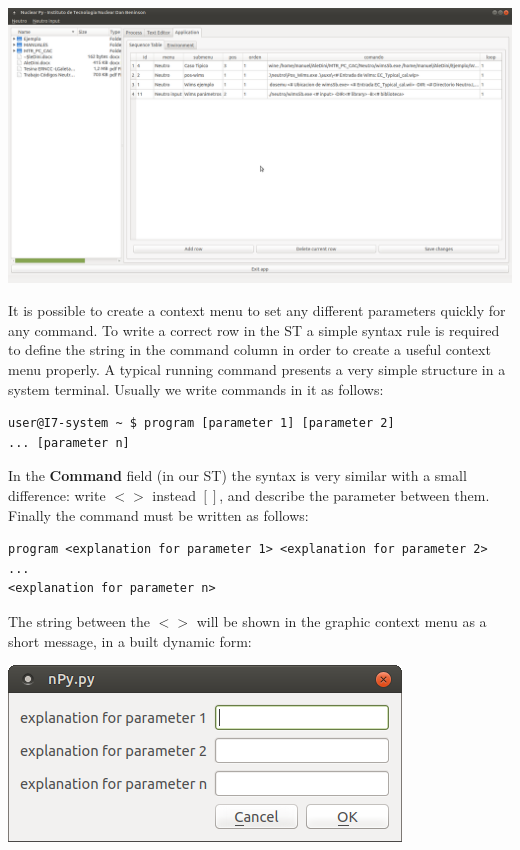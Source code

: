 \documentclass[a4paper,10pt]{article}
\begin{document}
\begin{center}
 \includegraphics[width=\textwidth]{img/sequenceTable.png}
\end{center}

It is possible to create a context menu to set any different parameters quickly for any command. To write a correct row in the ST a simple syntax rule is required to define the string in the command column in order to create a useful context menu properly. A typical running command presents a very simple structure in a system terminal. Usually we write commands in it as follows:

\begin{verbatim}
user@I7-system ~ $ program [parameter 1] [parameter 2] 
... [parameter n]
\end{verbatim}

In the \textbf{Command} field (in our ST) the syntax is very similar with a small difference: write $< >$ instead $[]$, and describe the parameter between them. Finally the command must be written as follows:

\begin{verbatim}
program <explanation for parameter 1> <explanation for parameter 2> 
... 
<explanation for parameter n>
 \end{verbatim}

The string between the $< >$ will be shown in the graphic context menu as a short message, in a built dynamic form: 
\begin{center}
 \includegraphics[width=\textwidth]{img/contextMenuExampleString.png}
\end{center}
\end{document}
